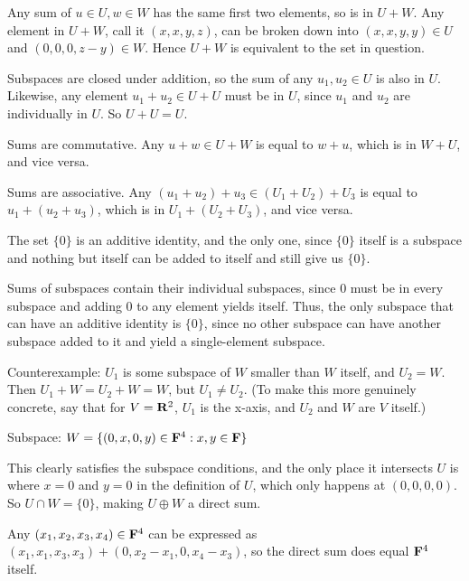 \documentclass{article}
\begin{document}

Any sum of $u \in U, w \in W$ has the same first two elements, so is in $U + W$.
Any element in $U + W$, call it $(x, x, y, z)$, can be broken down into $(x, x,
y, y) \in U$ and $(0, 0, 0, z-y) \in W$. Hence $U + W$ is equivalent to the set
in question.


Subspaces are closed under addition, so the sum of any $u_1, u_2 \in U$ is also
in $U$. Likewise, any element $u_1 + u_2 \in U + U$ must be in $U$, since $u_1$
and $u_2$ are individually in $U$. So $U + U = U$.


Sums are commutative. Any $u + w \in U + W$ is equal to $w + u$, which is in $W
+ U$, and vice versa.


Sums are associative. Any $(u_1 + u_2) + u_3 \in (U_1 + U_2) + U_3$ is equal to
$u_1 + (u_2 + u_3)$, which is in $U_1 + (U_2 + U_3)$, and vice versa.


The set $\{0\}$ is an additive identity, and the only one, since $\{0\}$ itself
is a subspace and nothing but itself can be added to itself and still give us
$\{0\}$.

Sums of subspaces contain their individual subspaces, since 0 must be in every
subspace and adding 0 to any element yields itself. Thus, the only subspace that
can have an additive identity is $\{0\}$, since no other subspace can have
another subspace added to it and yield a single-element subspace.


Counterexample: $U_1$ is some subspace of $W$ smaller than $W$ itself, and $U_2
= W$. Then $U_1 + W = U_2 + W = W$, but $U_1 \neq U_2$. (To make this more
genuinely concrete, say that for $V = \mathbf{R}^2$, $U_1$ is the x-axis, and $U_2$
and $W$ are $V$ itself.)


Subspace: $W = \{(0, x, 0, y) \in \mathbf{F}^4 : x, y \in \mathbf{F} \}$

This clearly satisfies the subspace conditions, and the only place it intersects
$U$ is where $x = 0$ and $y = 0$ in the definition of $U$, which only happens at
$(0,0,0,0)$. So $U \cap W = \{0\}$, making $U \oplus W$ a direct sum.

Any $(x_1, x_2, x_3, x_4) \in \mathbf{F}^4$ can be expressed as $(x_1, x_1, x_3,
x_3) + (0, x_2-x_1, 0, x_4-x_3)$, so the direct sum does equal $\mathbf{F}^4$ itself.
\end{document}
